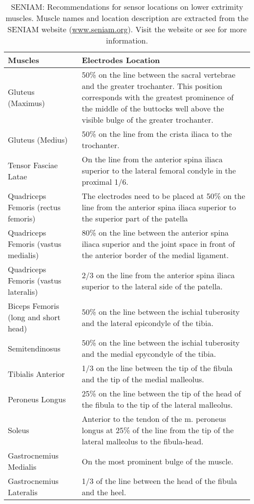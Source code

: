 {
\renewcommand{\arraystretch}{1.5}
\begin{table}[ht!]
    \centering
    \caption{\ac{SENIAM}: Recommendations for sensor locations on lower extrimity muscles. Muscle names and location description are extracted from the \ac{SENIAM} website (\href{www.seniam.org}{www.seniam.org}). Visit the website or see \cite{Hermens1999} for more information.}
    \label{tab:SENIAM-mus-and-loc}
    \small
    \begin{tabular}{>{\raggedright}p{4.2cm}|p{8cm}}
        Muscles & Electrodes Location \\ \hline
        Gluteus (Maximus) & 50\% on the line between the sacral vertebrae and the greater trochanter. This position corresponds with the greatest prominence of the middle of the buttocks well above the visible bulge of the greater trochanter. \\
        Gluteus (Medius) & 50\% on the line from the crista iliaca to the trochanter.\\
        Tensor Fasciae Latae & On the line from the anterior spina iliaca superior to the lateral femoral condyle in the proximal 1/6.\\
        Quadriceps Femoris (rectus femoris) & The electrodes need to be placed at 50\% on the line from the anterior spina iliaca superior to the superior part of the patella\\
        Quadriceps Femoris (vastus medialis) & 80\% on the line between the anterior spina iliaca superior and the joint space in front of the anterior border of the medial ligament.\\
        Quadriceps Femoris (vastus lateralis) & 2/3 on the line from the anterior spina iliaca superior to the lateral side of the patella.\\
        Biceps Femoris (long and short head) & 50\% on the line between the ischial tuberosity and the lateral epicondyle of the tibia.\\
        Semitendinosus & 50\% on the line between the ischial tuberosity and the medial epycondyle of the tibia.\\
        Tibialis Anterior & 1/3 on the line between the tip of the fibula and the tip of the medial malleolus.\\
        Peroneus Longus & 25\% on the line between the tip of the head of the fibula to the tip of the lateral malleolus.\\
        Soleus & Anterior to the tendon of the m. peroneus longus at 25\% of the line from the tip of the lateral malleolus to the fibula-head.\\
        Gastrocnemius Medialis & On the most prominent bulge of the muscle.\\
        Gastrocnemius Lateralis & 1/3 of the line between the head of the fibula and the heel.
    \end{tabular}
\end{table}
}


